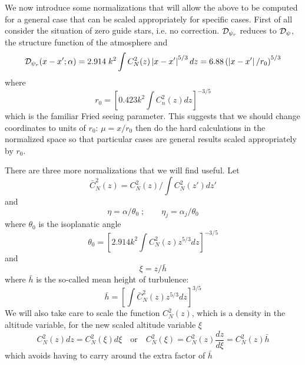 \documentclass[11pt, oneside]{article}   	%
\begin{document}
We now introduce some normalizations that will allow the above to be computed for a general case that can be scaled appropriately for specific cases. First of all consider the situation of zero guide stars, i.e. no correction. ${\cal D}_{\psi_r}$ reduces to ${\cal D}_\psi$, the structure function of the atmosphere and
\begin{equation}
\label{eqn:17}
{\cal D}_{\psi_r} (x-x';\alpha) = 2.914 \; k^2 \int C_N^2(z) \left | x-x' \right|^{5/3} dz = 6.88 \left( \left | x - x' \right| / r_0 \right)^{5/3}
\end{equation}
where
\begin{equation}
r_0 = \left [ 0.423 k^2 \int C_n^2(z) dz \right]^{-3/5}
\end{equation}
which is the familiar Fried seeing parameter. This suggests that we should change coordinates to units of $r_0$: $\mu = x / r_0$ then do the hard calculations in the normalized space so that particular cases are general results scaled appropriately by $r_0$.

There are three more normalizations that we will find useful. Let
\begin{equation}
\bar C_N^2(z) = C_N^2(z) \bigg/ \int C_N^2(z') dz'
\end{equation}
and
\begin{equation}
\label{eqn:etadef}
\eta = \alpha/\theta_0 \;;\quad \quad \eta_j = \alpha_j / \theta_0
\end{equation}
where $\theta_0$ is the isoplanatic angle 
\begin{equation}
\theta_0 = \left[ 2.914 k^2 \int C_N^2(z) z^{5/3} dz \right ] ^{-3/5}
\end{equation}
and
\begin{equation}
\label{eqn:xidef}
\xi = z / \bar h
\end{equation}
where $\bar h$ is the so-called mean height of turbulence:
\begin{equation}
\label{eqn:hbardef}
\bar h = \left [ \int \bar C_N^2 (z) z^{5/3} dz \right ]^{3/5}
\end{equation}
We will also take care to scale the function $C_N^2(z)$, which is a density in the altitude variable, for the new scaled altitude variable $\xi$
\begin{equation}
C_N^2(z) dz = C_N^2(\xi) d\xi \quad \text{or} \quad C_N^2(\xi) = C_N^2(z) \frac{dz}{d\xi} = C_N^2(z) \bar h
\end{equation}
which avoids having to carry around the extra factor of $\bar h$
\end{document}
